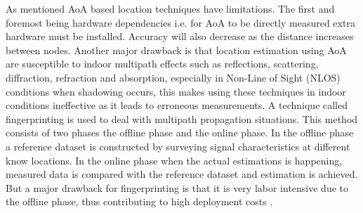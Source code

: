 As mentioned AoA based location techniques have limitations. The first and foremost being hardware dependencies i.e. for AoA to be directly measured extra hardware must be installed. Accuracy will also decrease as the distance increases between nodes. Another major drawback is that location estimation using AoA are susceptible to indoor multipath effects such as reflections, scattering, diffraction, refraction and absorption, especially in Non-Line of Sight (NLOS) conditions when shadowing occurs, this makes using these techniques in indoor conditions ineffective as it leads to erroneous measurements. A technique called fingerprinting is used to deal with multipath propagation situations. This method consists of two phases the offline phase and the online phase. In the offline phase a reference dataset is constructed by surveying signal characteristics at different know locations. In the online phase when the actual estimations is happening, measured data is compared with the reference dataset and estimation is achieved. But a major drawback for fingerprinting is that it is very labor intensive due to the offline phase, thus contributing to high deployment costs \cite{wielandt17}.